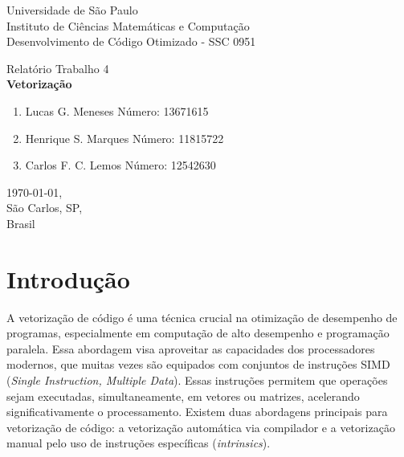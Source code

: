 \documentclass[12pt,a4paper]{article}
\begin{document}

\thispagestyle{empty}
\begin{minipage}{\textwidth}\centering
Universidade de São Paulo \\
Instituto de Ciências Matemáticas e Computação \\
Desenvolvimento de Código Otimizado - SSC 0951 \\
\end{minipage}

\vspace{5cm}

\begin{minipage}{\textwidth}\centering
\Large Relatório Trabalho 4  \\
\vspace{2cm}
\Large \textbf{Vetorização}
\end{minipage}

\vspace{3cm}

\begin{minipage}{\linewidth}\centering
\begin{enumerate}
     \item Lucas G. Meneses   \space \space \space \space \space \space  Número: 13671615
      \item Henrique S. Marques  \space \space Número: 11815722
      \item Carlos F. C. Lemos  \space \space \space \space Número: 12542630
\end{enumerate}
\end{minipage}

\vfill

\begin{minipage}{\linewidth}
\centering\today, \\
São Carlos, SP, \\
Brasil
\end{minipage}

\clearpage
\thispagestyle{empty}

\tableofcontents

\section{Introdução}


A vetorização de código é uma técnica crucial na otimização de desempenho de programas, especialmente em computação de alto desempenho e programação paralela. Essa abordagem visa aproveitar as capacidades dos processadores modernos, que muitas vezes são equipados com conjuntos de instruções SIMD (\textit{Single Instruction, Multiple Data}). Essas instruções permitem que operações sejam executadas, simultaneamente, em vetores ou matrizes, acelerando significativamente o processamento. Existem duas abordagens principais para vetorização de código: a vetorização automática via compilador e a vetorização manual pelo uso de instruções específicas (\textit{intrinsics}).
\end{document}
